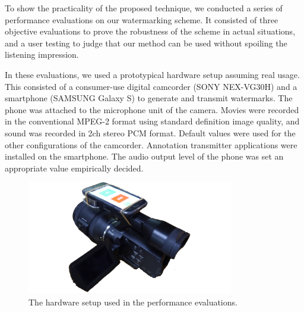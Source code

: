 To show the practicality of the proposed technique, we conducted a series of performance evaluations on our watermarking scheme.
It consisted of three objective evaluations to prove the robustness of the scheme in actual situations, and a user testing to judge that our method can be used without spoiling the listening impression.

In these evaluations, we used a prototypical hardware setup assuming real usage.
This consisted of a consumer-use digital camcorder (SONY NEX-VG30H) and a smartphone (SAMSUNG Galaxy S) to generate and transmit watermarks.
The phone was attached to the microphone unit of the camera.
Movies were recorded in the conventional MPEG-2 format using standard definition image quality, and sound was recorded in 2ch stereo PCM format.
Default values were used for the other configurations of the camcorder.
Annotation transmitter applications were installed on the smartphone.
The audio output level of the phone was set an appropriate value empirically decided.

\begin{figure}[htbp]
 \begin{center}
  \vspace{5mm}
  \includegraphics[width=90mm]{evaluation_environment.pdf}
 \end{center}
 \caption{The hardware setup used in the performance evaluations.}
 \label{fig:eval_hard}
\end{figure}

